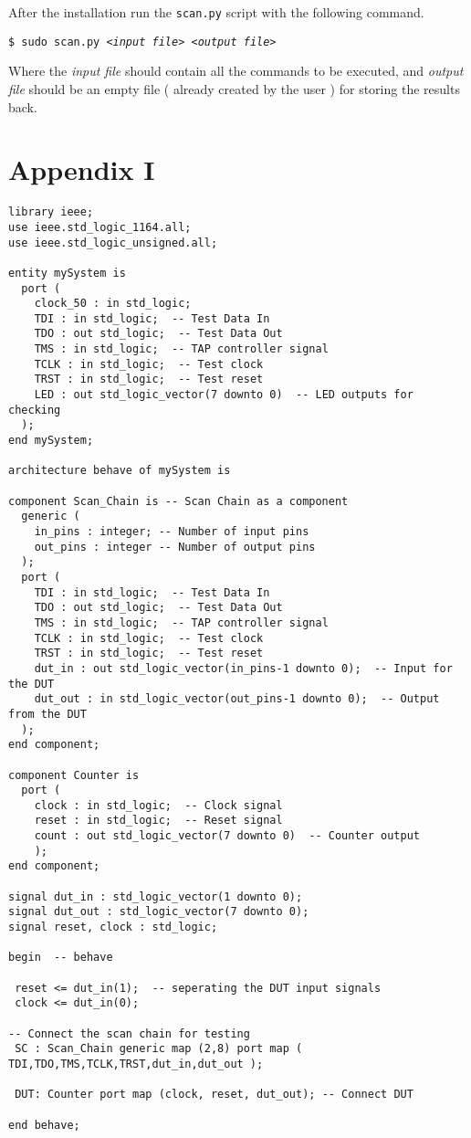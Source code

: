 \documentclass[a4paper,11pt]{article}
\begin{document}
After the installation run the \texttt{scan.py} script with the following command.
\begin{center}
\texttt{\$ sudo scan.py \textit{<input file>} \textit{<output file>}} 
\end{center}

Where the \textit{input file} should contain all the commands to be executed, and \textit{output file} should be an empty file ( already created by the user ) for storing the results back.


\newpage	
	




\section*{Appendix I}
\begin{verbatim}
library ieee;
use ieee.std_logic_1164.all;
use ieee.std_logic_unsigned.all;

entity mySystem is
  port (
    clock_50 : in std_logic;
    TDI : in std_logic;  -- Test Data In
    TDO : out std_logic;  -- Test Data Out
    TMS : in std_logic;  -- TAP controller signal
    TCLK : in std_logic;  -- Test clock
    TRST : in std_logic;  -- Test reset
    LED : out std_logic_vector(7 downto 0)  -- LED outputs for checking
  );
end mySystem;

architecture behave of mySystem is

component Scan_Chain is	-- Scan Chain as a component
  generic (
    in_pins : integer; -- Number of input pins
    out_pins : integer -- Number of output pins
  );
  port (
    TDI : in std_logic;  -- Test Data In
    TDO : out std_logic;  -- Test Data Out
    TMS : in std_logic;  -- TAP controller signal
    TCLK : in std_logic;  -- Test clock
    TRST : in std_logic;  -- Test reset
    dut_in : out std_logic_vector(in_pins-1 downto 0);  -- Input for the DUT
    dut_out : in std_logic_vector(out_pins-1 downto 0);  -- Output from the DUT
  );
end component;

component Counter is
  port (
    clock : in std_logic;  -- Clock signal
    reset : in std_logic;  -- Reset signal
    count : out std_logic_vector(7 downto 0)  -- Counter output
    );
end component;

signal dut_in : std_logic_vector(1 downto 0);
signal dut_out : std_logic_vector(7 downto 0);
signal reset, clock : std_logic;

begin  -- behave

 reset <= dut_in(1);  -- seperating the DUT input signals
 clock <= dut_in(0);

-- Connect the scan chain for testing 
 SC : Scan_Chain generic map (2,8) port map ( TDI,TDO,TMS,TCLK,TRST,dut_in,dut_out );

 DUT: Counter port map (clock, reset, dut_out); -- Connect DUT
  
end behave;
\end{verbatim}
\end{document}

